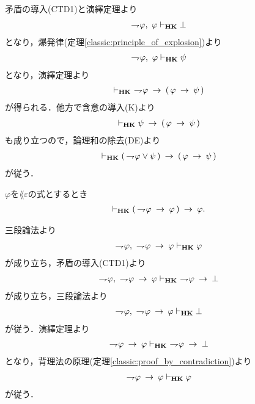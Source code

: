 	\begin{sketch}
		矛盾の導入(CTD1)と演繹定理より
		\begin{align}
			\negation \varphi,\ \varphi \provable{\mbox{{\bf HK}}} \bot 
		\end{align}
		となり，爆発律(定理\ref{classic:principle_of_explosion})より
		\begin{align}
			\negation \varphi,\ \varphi \provable{\mbox{{\bf HK}}} \psi
		\end{align}
		となり，演繹定理より
		\begin{align}
			\provable{\mbox{{\bf HK}}}\ \negation \varphi \rarrow 
			(\, \varphi \rarrow \psi\, )
		\end{align}
		が得られる．他方で含意の導入(K)より
		\begin{align}
			\provable{\mbox{{\bf HK}}} \psi \rarrow (\, \varphi \rarrow \psi\, )
		\end{align}
		も成り立つので，論理和の除去(DE)より
		\begin{align}
			\provable{\mbox{{\bf HK}}} (\, \negation \varphi \vee \psi\, ) 
			\rarrow (\, \varphi \rarrow \psi\, )
		\end{align}
		が従う．
		\QED
	\end{sketch}
	
	\begin{screen}
		\begin{thm}[驚嘆すべき帰結]\label{classic:consequentia_mirabilis}
			$\varphi$を$\lang{\varepsilon}$の式とするとき
			\begin{align}
				\provable{\mbox{{\bf HK}}} 
				(\, \negation \varphi \rarrow \varphi\, ) \rarrow \varphi.
			\end{align}
		\end{thm}
	\end{screen}
	
	\begin{sketch}
		三段論法より
		\begin{align}
			\negation \varphi,\ \negation \varphi \rarrow \varphi
			\provable{\mbox{{\bf HK}}} \varphi
		\end{align}
		が成り立ち，矛盾の導入(CTD1)より
		\begin{align}
			\negation \varphi,\ \negation \varphi \rarrow \varphi
			\provable{\mbox{{\bf HK}}}\ \negation \varphi \rarrow \bot
		\end{align}
		が成り立ち，三段論法より
		\begin{align}
			\negation \varphi,\ \negation \varphi \rarrow \varphi
			\provable{\mbox{{\bf HK}}} \bot
		\end{align}
		が従う．演繹定理より
		\begin{align}
			\negation \varphi \rarrow \varphi
			\provable{\mbox{{\bf HK}}}\ \negation \varphi \rarrow \bot
		\end{align}
		となり，背理法の原理(定理\ref{classic:proof_by_contradiction})より
		\begin{align}
			\negation \varphi \rarrow \varphi
			\provable{\mbox{{\bf HK}}} \varphi
		\end{align}
		が従う．
		\QED
	\end{sketch}
	
